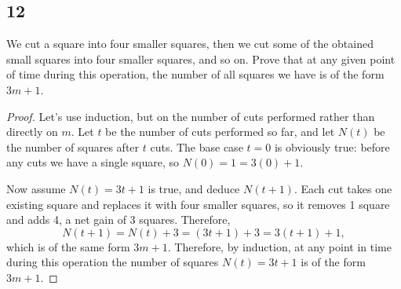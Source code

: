 \documentclass{amsart}
\begin{document}
\subsection*{12} We cut a square into four smaller squares, then we cut some of the obtained small squares into four smaller squares, and so on. Prove that at any given point of time during this operation, the number of all squares we have is of the form $3m+1$.
\begin{proof}
     Let's use induction, but on the number of cuts performed rather than directly on $m$. Let $t$ be the number of cuts performed so far, and let $N(t)$ be the number of squares after $t$ cuts. The base case $t=0$ is obviously true: before any cuts we have a single square, so $N(0) = 1 = 3(0)+1$.
 
    Now assume $N(t) = 3t+1$ is true, and deduce $N(t+1)$. Each cut takes one existing square and replaces it with four smaller squares, so it removes 1 square and adds 4, a net gain of 3 squares. Therefore,
    \[
    N(t+1) = N(t) + 3 = (3t+1)+3 = 3(t+1)+1,
    \]
    which is of the same form $3m+1$. Therefore, by induction, at any point in time during this operation the number of squares $N(t) = 3t+1$ is of the form $3m+1$.
\end{proof}
\end{document}
